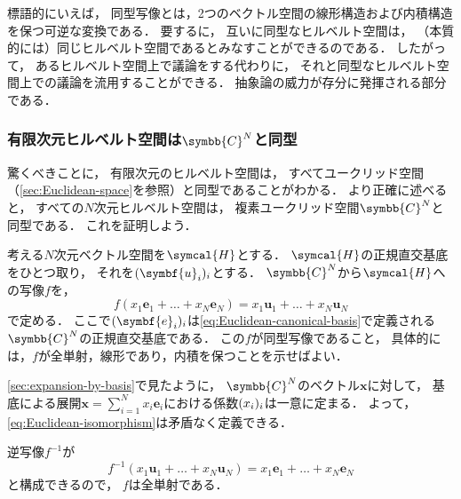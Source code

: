 \documentclass[
]{sotsu}
\begin{document}
標語的にいえば，
同型写像とは，2つのベクトル空間の線形構造および内積構造を保つ可逆な変換である．
要するに，
互いに同型なヒルベルト空間は，
（本質的には）同じヒルベルト空間であるとみなすことができるのである．
したがって，
あるヒルベルト空間上で議論をする代わりに，
それと同型なヒルベルト空間上での議論を流用することができる．
抽象論の威力が存分に発揮される部分である．





\subsubsection{有限次元ヒルベルト空間は\texorpdfstring{$\symbb{C}^N$}{ℂ\^N}と同型}

驚くべきことに，
有限次元のヒルベルト空間は，
すべてユークリッド空間（\cref{sec:Euclidean-space}を参照）と同型であることがわかる．
より正確に述べると，
すべての$N$次元ヒルベルト空間は，
複素ユークリッド空間$\symbb{C}^N$と同型である．
これを証明しよう．

考える$N$次元ベクトル空間を$\symcal{H}$とする．
$\symcal{H}$の正規直交基底をひとつ取り，
それを$\sequ{\symbf{u}_i}[i]$とする．
$\symbb{C}^N$から$\symcal{H}$への写像$f$を，
\begin{equation}
    \label{eq:Euclidean-isomorphism}
    f(x_1 \symbf{e}_1 + \dots + x_N \symbf{e}_N)
    = x_1 \symbf{u}_1 + \dots + x_N \symbf{u}_N
\end{equation}
で定める．
ここで$\sequ{\symbf{e}_i}[i]$は\cref{eq:Euclidean-canonical-basis}で定義される$\symbb{C}^N$の正規直交基底である．
この$f$が同型写像であること，
具体的には，$f$が全単射，線形であり，内積を保つことを示せばよい．

\quad
\cref{sec:expansion-by-basis}で見たように，
$\symbb{C}^N$のベクトル$\symbf{x}$に対して，
基底による展開$\symbf{x} = \sum_{i=1}^{N} x_i \symbf{e}_i$における係数$\sequ{x_i}[i]$は一意に定まる．
よって，\cref{eq:Euclidean-isomorphism}は矛盾なく定義できる．



\quad
逆写像$f^{-1}$が
\begin{equation*}
    f^{-1} (x_1 \symbf{u}_1 + \dots + x_N \symbf{u}_N)
        = x_1 \symbf{e}_1 + \dots + x_N \symbf{e}_N
\end{equation*}
と構成できるので，
$f$は全単射である．
\end{document}
